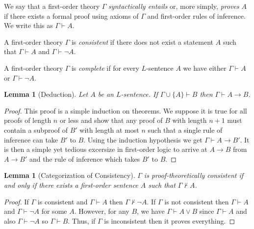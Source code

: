 \documentclass[12pt]{article}
\newcommand{\proves}{\vdash}
\newenvironment{definition}[1][Definition:]{\begin{trivlist}
\item[\hskip \labelsep {\bfseries #1}]}{\end{trivlist}}
\theoremstyle{theorem}
\newtheorem{lemma}[theorem]{Lemma}
\theoremstyle{definition}
\theoremstyle{definition}
\theoremstyle{remark}
\theoremstyle{definition}
\theoremstyle{remark}
\begin{document}
\begin{definition}
We say that a first-order theory $\Gamma$ \textit{syntactically entails} or, more simply, \textit{proves} $A$ if there exists a formal proof using axioms of $\Gamma$ and first-order rules of inference. We write this as $\Gamma \vdash A$.
\end{definition}

\begin{definition}
A first-order theory $\Gamma$ is \textit{consistent} if there does not exist a statement $A$ such that $\Gamma \proves A$ and $\Gamma \proves \neg A$. 
\end{definition}

\begin{definition}
A first-order theory $\Gamma$ is \textit{complete} if for every $L$-sentence $A$ we have either $\Gamma \proves A$ or $\Gamma \proves \neg A$. 
\end{definition}

\begin{lemma}[Deduction]
Let $A$ be an $L$-sentence. If $\Gamma \cup \{ A \} \proves B$ then $\Gamma \proves A \to B$. 
\end{lemma}

\begin{proof}
This proof is a simple induction on theorems. We suppose it is true for all proofs of length $n$ or less and show that any proof of $B$ with length $n+1$ must contain a subproof of $B'$ with length at most $n$ such that a single rule of inference can take $B'$ to $B$. Using the induction hypothesis we get $\Gamma \proves A \to B'$. It is then a simple yet tedious excersize in first-order logic to arrive at $A \to B$ from $A \to B'$ and the rule of inference which takes $B'$ to $B$. 
\end{proof}

\begin{lemma}[Categorization of Consistency]
$\Gamma$ is proof-theoretically consistent if and only if there exists a first-order sentence $A$ such that $\Gamma \not\proves A$. 
\end{lemma}

\begin{proof}
If $\Gamma$ is consistent and $\Gamma \proves A$ then $\Gamma \not\proves \neg A$. If $\Gamma$ is not consistent then $\Gamma \proves A$ and $\Gamma \proves \neg A$ for some $A$. However, for any $B$, we have $\Gamma \proves A \vee B$ since $\Gamma \proves A$ and also $\Gamma \proves \neg A$ so $\Gamma \proves B$. Thus, if $\Gamma$ is inconsistent then it proves everything.  
\end{proof}
\end{document}
